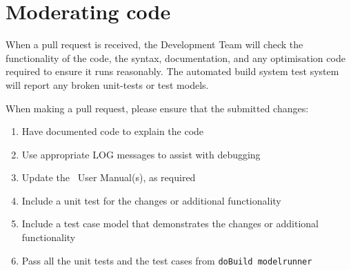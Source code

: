 \section{Moderating code\label{sec:Maintaining}}

When a pull request is received, the Development Team will check the functionality of the code, the syntax, documentation, and any optimisation code required to ensure it runs reasonably. The automated build system test system will report any broken unit-tests or test models. 

When making a pull request, please ensure that the submitted changes:

\begin{enumerate}
	\item Have documented code to explain the code
	\item Use appropriate LOG messages to assist with debugging
	\item Update the \CNAME\ User Manual(s), as required
	\item Include a unit test for the changes or additional functionality
	\item Include a test case model that demonstrates the changes or additional functionality
	\item Pass all the unit tests and the test cases from \texttt{doBuild modelrunner}
\end{enumerate}
